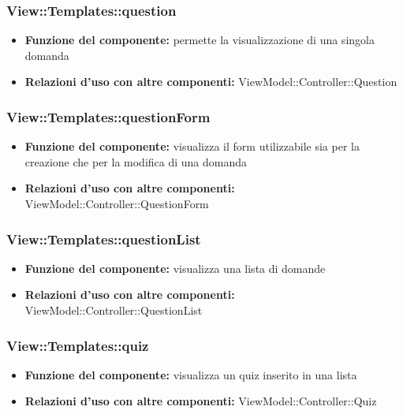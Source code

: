 \subsubsection{View::Templates::question}
\begin{itemize}
\item\textbf{Funzione del componente:} permette la visualizzazione di una singola domanda\\
\item\textbf{Relazioni d'uso con altre componenti:} ViewModel::Controller::Question\\
\end{itemize}
\subsubsection{View::Templates::questionForm}
\begin{itemize}
\item\textbf{Funzione del componente:} visualizza il form utilizzabile sia per la creazione che per la modifica di una domanda\\
\item\textbf{Relazioni d'uso con altre componenti:} ViewModel::Controller::QuestionForm\\
\end{itemize}
\subsubsection{View::Templates::questionList}
\begin{itemize}
\item\textbf{Funzione del componente:} visualizza una lista di domande\\
\item\textbf{Relazioni d'uso con altre componenti:} ViewModel::Controller::QuestionList\\
\end{itemize}
\subsubsection{View::Templates::quiz}
\begin{itemize}
\item\textbf{Funzione del componente:} visualizza un quiz inserito in una lista\\
\item\textbf{Relazioni d'uso con altre componenti:} ViewModel::Controller::Quiz\\
\end{itemize}
